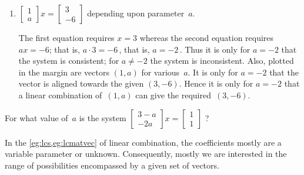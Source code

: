 \begin{example}
\begin{enumerate}
\item \(\begin{bmatrix} 1\\a \end{bmatrix}x
=\begin{bmatrix} 3\\-6 \end{bmatrix}\) depending upon parameter~\(a\).
\begin{solution} 
The first equation requires \(x=3\) whereas the second equation requires \(ax=-6\); that is, \(a\cdot3=-6\)\,, that is, \(a=-2\)\,.
Thus it is only for \(a=-2\) that the system is consistent;
for \(a\neq-2\) the system is inconsistent.
Also, plotted in the margin are vectors \((1,a)\) for various~\(a\).
It is only for \(a=-2\) that the vector is aligned towards the given \((3,-6)\).
Hence it is only for \(a=-2\) that a linear combination of~\((1,a)\) can give the required~\((3,-6)\).
\end{solution}

\end{enumerate}
\end{example}




\begin{activity}
For what value of~\(a\) is the system \(\begin{bmatrix} 3-a\\-2a \end{bmatrix}x=\begin{bmatrix} 1\\1 \end{bmatrix}\) ?
\end{activity}



In the \cref{eg:lcs,eg:lcmatvec} of linear combination, the coefficients mostly are a variable parameter or unknown.
Consequently, mostly we are interested in the range of possibilities encompassed by a given set of vectors.


